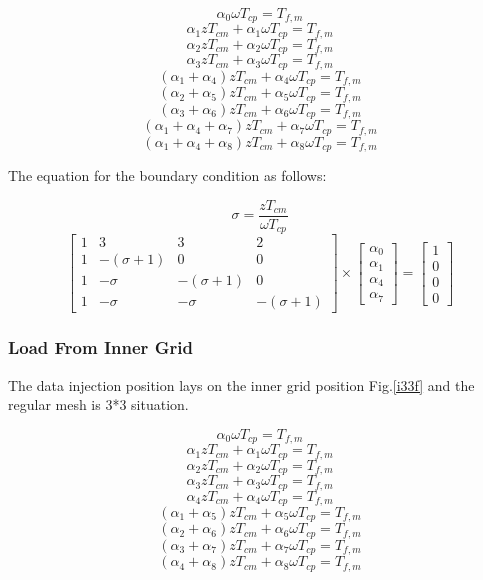 $$\alpha_{0} \omega T_{cp} = T_{f,m}$$ 
$$\alpha_{1}zT_{cm} + \alpha_{1} \omega T_{cp} = T_{f,m}$$
$$\alpha_{2}zT_{cm} + \alpha_{2} \omega T_{cp} = T_{f,m}$$
$$\alpha_{3}zT_{cm} + \alpha_{3} \omega T_{cp} = T_{f,m}$$
$$(\alpha_{1} + \alpha_{4})zT_{cm} + \alpha_{4}\omega T_{cp} = T_{f,m}$$
$$(\alpha_{2} + \alpha_{5})zT_{cm} + \alpha_{5}\omega T_{cp} = T_{f,m}$$
$$(\alpha_{3} + \alpha_{6})zT_{cm} + \alpha_{6}\omega T_{cp} = T_{f,m}$$
$$(\alpha_{1} + \alpha_{4} +\alpha_{7})zT_{cm} + \alpha_{7}\omega T_{cp} = T_{f,m}$$
$$(\alpha_{1} + \alpha_{4} +\alpha_{8})zT_{cm} + \alpha_{8}\omega T_{cp} = T_{f,m}$$

The equation for the boundary condition as follows:

$$\sigma = \frac{zT_{cm}}{\omega T_{cp}}$$
\begin{equation}
{
\left[ \begin{array}{cccc}
1 & 3 & 3 & 2\\
1 & -(\sigma + 1) & 0 & 0\\
1 & -\sigma & -(\sigma + 1) & 0\\
1 & -\sigma & -\sigma & -(\sigma + 1)
\end{array} 
\right ]} \times \left[ \begin{array}{c}
\alpha_{0} \\
\alpha_{1} \\
\alpha_{4} \\
\alpha_{7}
\end{array} 
\right ] = \left[ \begin{array}{c}
1 \\
0 \\
0 \\
0
\end{array} 
\right ]
\end{equation}



\vspace*{50pt}
\subsubsection{Load From Inner Grid}
The data injection position lays on the inner grid position Fig.\ref{i33f} and the regular mesh is 3*3 situation.

$$\alpha_{0} \omega T_{cp} = T_{f,m}$$ 
$$\alpha_{1}zT_{cm} + \alpha_{1} \omega T_{cp} = T_{f,m}$$
$$\alpha_{2}zT_{cm} + \alpha_{2} \omega T_{cp} = T_{f,m}$$
$$\alpha_{3}zT_{cm} + \alpha_{3} \omega T_{cp} = T_{f,m}$$
$$\alpha_{4}zT_{cm} + \alpha_{4} \omega T_{cp} = T_{f,m}$$
$$(\alpha_{1} + \alpha_{5})zT_{cm} + \alpha_{5}\omega T_{cp} = T_{f,m}$$
$$(\alpha_{2} + \alpha_{6})zT_{cm} + \alpha_{6}\omega T_{cp} = T_{f,m}$$
$$(\alpha_{3} + \alpha_{7})zT_{cm} + \alpha_{7}\omega T_{cp} = T_{f,m}$$
$$(\alpha_{4} + \alpha_{8})zT_{cm} + \alpha_{8}\omega T_{cp} = T_{f,m}$$

